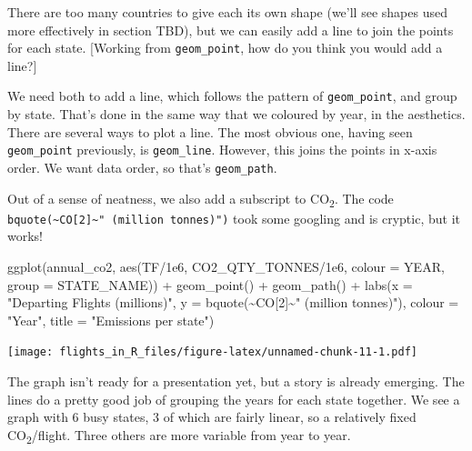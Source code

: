 \documentclass[
]{book}
\newenvironment{Shaded}{\begin{snugshade}}{\end{snugshade}}
\newcommand{\AttributeTok}[1]{\textcolor[rgb]{0.77,0.63,0.00}{#1}}
\newcommand{\DecValTok}[1]{\textcolor[rgb]{0.00,0.00,0.81}{#1}}
\newcommand{\FloatTok}[1]{\textcolor[rgb]{0.00,0.00,0.81}{#1}}
\newcommand{\FunctionTok}[1]{\textcolor[rgb]{0.00,0.00,0.00}{#1}}
\newcommand{\NormalTok}[1]{#1}
\newcommand{\SpecialCharTok}[1]{\textcolor[rgb]{0.00,0.00,0.00}{#1}}
\newcommand{\StringTok}[1]{\textcolor[rgb]{0.31,0.60,0.02}{#1}}
\begin{document}
There are too many countries to give each its own shape (we'll see shapes used more effectively in section TBD), but we can easily add a line to join the points for each state. {[}Working from \texttt{geom\_point}, how do you think you would add a line?{]}

We need both to add a line, which follows the pattern of \texttt{geom\_point}, and group by state. That's done in the same way that we coloured by year, in the aesthetics. There are several ways to plot a line. The most obvious one, having seen \texttt{geom\_point} previously, is \texttt{geom\_line}. However, this joins the points in x-axis order. We want data order, so that's \texttt{geom\_path}.

Out of a sense of neatness, we also add a subscript to CO\textsubscript{2}. The code \texttt{bquote(\textasciitilde{}CO{[}2{]}\textasciitilde{}"\ (million\ tonnes)")} took some googling and is cryptic, but it works!

\begin{Shaded}
\begin{Highlighting}[]
\FunctionTok{ggplot}\NormalTok{(annual\_co2, }\FunctionTok{aes}\NormalTok{(TF}\SpecialCharTok{/}\FloatTok{1e6}\NormalTok{, CO2\_QTY\_TONNES}\SpecialCharTok{/}\FloatTok{1e6}\NormalTok{, }
                         \AttributeTok{colour =}\NormalTok{ YEAR, }\AttributeTok{group =}\NormalTok{ STATE\_NAME)) }\SpecialCharTok{+}
  \FunctionTok{geom\_point}\NormalTok{() }\SpecialCharTok{+} 
  \FunctionTok{geom\_path}\NormalTok{() }\SpecialCharTok{+}
  \FunctionTok{labs}\NormalTok{(}\AttributeTok{x =} \StringTok{"Departing Flights (millions)"}\NormalTok{, }
       \AttributeTok{y =} \FunctionTok{bquote}\NormalTok{(}\SpecialCharTok{\textasciitilde{}}\NormalTok{CO[}\DecValTok{2}\NormalTok{]}\SpecialCharTok{\textasciitilde{}}\StringTok{" (million tonnes)"}\NormalTok{),}
       \AttributeTok{colour =} \StringTok{"Year"}\NormalTok{,}
       \AttributeTok{title =} \StringTok{"Emissions per state"}\NormalTok{)}
\end{Highlighting}
\end{Shaded}

\texttt{[image: flights\_in\_R\_files/figure-latex/unnamed-chunk-11-1.pdf]}

The graph isn't ready for a presentation yet, but a story is already emerging. The lines do a pretty good job of grouping the years for each state together. We see a graph with 6 busy states, 3 of which are fairly linear, so a relatively fixed CO\textsubscript{2}/flight. Three others are more variable from year to year.
\end{document}
